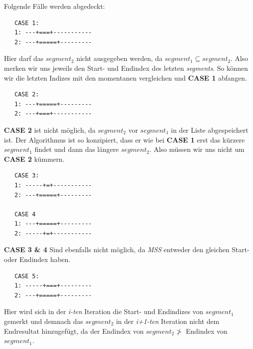 \documentclass[10pt]{article}
\begin{document}
Folgende Fälle werden abgedeckt: \\
\begin{verbatim} 
   CASE 1:
   1: ---+===+-----------
   2: ---+=====+---------
\end{verbatim}
Hier darf das $segment_{2}$ nicht ausgegeben werden, da $segment_{1} \subseteq segment_2$. Also merken wir uns
jeweils den Start- und Endindex des letzten \textit{segments}. So können wir die letzten Indizes mit den 
momentanen vergleichen und \textbf{CASE 1} abfangen. 

\begin{verbatim}
   CASE 2:
   1: ---+=====+---------
   2: ---+===+-----------
\end{verbatim}
\textbf{CASE 2} ist nicht möglich, da $segment_{2}$ vor $segment_{1}$ in der Liste abgespeichert ist.
Der Algorithmus ist so konzipiert, dass er wie bei \textbf{CASE 1} erst das kürzere $segment_{1}$ findet und dann das
längere $segment_{2}$. Also müssen wir uns nicht um \textbf{CASE 2} kümmern.
\begin{verbatim}
   CASE 3:
   1: -----+=+-----------
   2: ---+=====+---------

   CASE 4
   1: ---+=====+---------
   2: -----+=+-----------
\end{verbatim}
\textbf{CASE 3 \& 4} Sind ebenfalls nicht möglich, da \textit{MSS} entweder den gleichen Start- oder Endindex haben.

\begin{verbatim} 
   CASE 5:
   1: -----+===+---------
   2: ---+=====+---------
\end{verbatim}
Hier wird sich in der \textit{i-ten} Iteration die Start- und Endindizes von $segment_{1}$ gemerkt
und demnach das $segment_{2}$ in der \textit{i+1-ten} Iteration nicht dem Endresultat hinzugefügt,
da der Endindex von $segment_2 \not >$  Endindex von $segment_1$.
\end{document}
